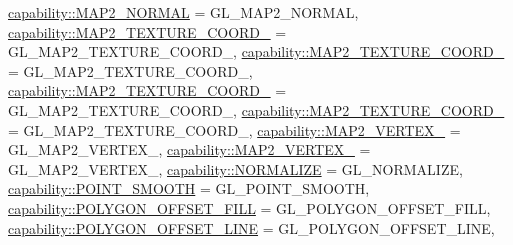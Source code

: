 \begin{DoxyCompactItemize}
\hyperlink{namespaceglpp_a1b0f7d2f17d11ae11a12d44571612832a542bb9b04e440f2bc0b2fe304aafbe3d}{capability\+::\+M\+A\+P2\+\_\+\+N\+O\+R\+M\+AL} = G\+L\+\_\+\+M\+A\+P2\+\_\+\+N\+O\+R\+M\+AL, 
\hyperlink{namespaceglpp_a1b0f7d2f17d11ae11a12d44571612832a22e905545c8b5cc6f0b86797557536d7}{capability\+::\+M\+A\+P2\+\_\+\+T\+E\+X\+T\+U\+R\+E\+\_\+\+C\+O\+O\+R\+D\+\_} = G\+L\+\_\+\+M\+A\+P2\+\_\+\+T\+E\+X\+T\+U\+R\+E\+\_\+\+C\+O\+O\+R\+D\+\_, 
\newline
\hyperlink{namespaceglpp_a1b0f7d2f17d11ae11a12d44571612832a66ecaf25bdeae1b057b55da359a7c621}{capability\+::\+M\+A\+P2\+\_\+\+T\+E\+X\+T\+U\+R\+E\+\_\+\+C\+O\+O\+R\+D\+\_} = G\+L\+\_\+\+M\+A\+P2\+\_\+\+T\+E\+X\+T\+U\+R\+E\+\_\+\+C\+O\+O\+R\+D\+\_, 
\hyperlink{namespaceglpp_a1b0f7d2f17d11ae11a12d44571612832a844a3987da8f1ed8e35658674b48225b}{capability\+::\+M\+A\+P2\+\_\+\+T\+E\+X\+T\+U\+R\+E\+\_\+\+C\+O\+O\+R\+D\+\_} = G\+L\+\_\+\+M\+A\+P2\+\_\+\+T\+E\+X\+T\+U\+R\+E\+\_\+\+C\+O\+O\+R\+D\+\_, 
\hyperlink{namespaceglpp_a1b0f7d2f17d11ae11a12d44571612832ace9ad0f7974e7f7946be04fa6795391f}{capability\+::\+M\+A\+P2\+\_\+\+T\+E\+X\+T\+U\+R\+E\+\_\+\+C\+O\+O\+R\+D\+\_} = G\+L\+\_\+\+M\+A\+P2\+\_\+\+T\+E\+X\+T\+U\+R\+E\+\_\+\+C\+O\+O\+R\+D\+\_, 
\hyperlink{namespaceglpp_a1b0f7d2f17d11ae11a12d44571612832a78c9e02a09fc1028e4eb5fcae1387e58}{capability\+::\+M\+A\+P2\+\_\+\+V\+E\+R\+T\+E\+X\+\_} = G\+L\+\_\+\+M\+A\+P2\+\_\+\+V\+E\+R\+T\+E\+X\+\_, 
\newline
\hyperlink{namespaceglpp_a1b0f7d2f17d11ae11a12d44571612832a58041cc5462cd086cb877f0711ff0412}{capability\+::\+M\+A\+P2\+\_\+\+V\+E\+R\+T\+E\+X\+\_} = G\+L\+\_\+\+M\+A\+P2\+\_\+\+V\+E\+R\+T\+E\+X\+\_, 
\hyperlink{namespaceglpp_a1b0f7d2f17d11ae11a12d44571612832a4aea7addd87d476e1a94d7dbda99a367}{capability\+::\+N\+O\+R\+M\+A\+L\+I\+ZE} = G\+L\+\_\+\+N\+O\+R\+M\+A\+L\+I\+ZE, 
\hyperlink{namespaceglpp_a1b0f7d2f17d11ae11a12d44571612832a7a3baa3b619cb75c4a8ad3f583017444}{capability\+::\+P\+O\+I\+N\+T\+\_\+\+S\+M\+O\+O\+TH} = G\+L\+\_\+\+P\+O\+I\+N\+T\+\_\+\+S\+M\+O\+O\+TH, 
\hyperlink{namespaceglpp_a1b0f7d2f17d11ae11a12d44571612832aef06a77807957acea02587093deb56fd}{capability\+::\+P\+O\+L\+Y\+G\+O\+N\+\_\+\+O\+F\+F\+S\+E\+T\+\_\+\+F\+I\+LL} = G\+L\+\_\+\+P\+O\+L\+Y\+G\+O\+N\+\_\+\+O\+F\+F\+S\+E\+T\+\_\+\+F\+I\+LL, 
\newline
\hyperlink{namespaceglpp_a1b0f7d2f17d11ae11a12d44571612832ad388aec6be2c5d9052a3cf3c00f7aca6}{capability\+::\+P\+O\+L\+Y\+G\+O\+N\+\_\+\+O\+F\+F\+S\+E\+T\+\_\+\+L\+I\+NE} = G\+L\+\_\+\+P\+O\+L\+Y\+G\+O\+N\+\_\+\+O\+F\+F\+S\+E\+T\+\_\+\+L\+I\+NE, 

\end{DoxyCompactItemize}
